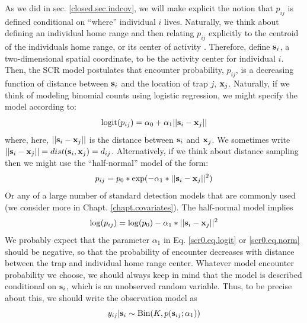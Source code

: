 As we did in sec. \ref{closed.sec.indcov}, we will make explicit the notion that
$p_{ij}$ is defined conditional on ``where'' individual $i$
lives. Naturally, we think about defining an individual home range and
then relating $p_{ij}$ explicitly to the centroid of the individuals
home range, or its center of activity \citep{efford:2004,
  borchers_efford:2008, royle_young:2008}.  Therefore, define ${\bf
  s}_{i}$, a two-dimensional spatial coordinate, to be the activity
center for individual $i$. Then, the SCR model postulates that
encounter probability, $p_{ij}$, is a decreasing function
of distance between ${\bf s}_{i}$ and the location of trap $j$, ${\bf x}_{j}$.
 Naturally, if we think of modeling binomial counts using
logistic regression, we might specify the model according to:
\begin{equation}
	\mbox{logit}(p_{ij}) = \alpha_{0} + \alpha_1 ||{\bf s}_{i}-{\bf x}_{j} ||
\label{scr0.eq.logit}
\end{equation}
where, here, $||{\bf s}_{i}-{\bf x}_{j}||$ is the distance between
${\bf s}_{i}$ and ${\bf x}_{j}$. We sometimes write $||{\bf
  s}_{i}-{\bf x}_{j}|| = dist({\bf s}_{i},{\bf x}_{j}) =
d_{ij}$. Alternatively, if we think about distance sampling then we
might use the ``half-normal'' model of the form:
\[
p_{ij} = p_{0}*\exp(-\alpha_{1} *||{\bf s}_{i}-{\bf x}_{j}||^2)
\]
Or any of a large number of standard detection models that are
commonly used (we consider more in Chapt. \ref{chapt.covariates}). The half-normal model implies
\begin{equation}
\log(p_{ij})  = \log(p_{0}) - \alpha_{1} *||{\bf s}_{i}-{\bf x}_{j}||^2
\label{scr0.eq.norm}
\end{equation}
We probably expect that the parameter $\alpha_{1}$ in
Eq. \ref{scr0.eq.logit} or \ref{scr0.eq.norm} should be negative, so
that the probability of encounter decreases with distance between the
trap and individual home range center.  
Whatever model encounter probability we choose, we should always keep
in mind that the model is described conditional on ${\bf s}_{i}$,
which is an unobserved random variable.  Thus, to be precise about
this, we should write the observation model as
\[
y_{ij}|{\bf s}_{i} \sim \mbox{Bin}(K, p({\bf s}_{ij};\alpha_{1}))
\]


